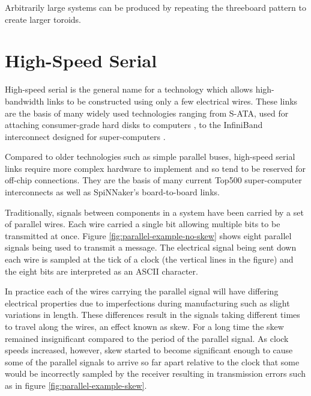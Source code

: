 			Arbitrarily large systems can be produced by repeating the threeboard
			pattern to create larger toroids.
	
	\break
	\section{High-Speed Serial}
		
		\label{sec:high-speed-serial}
		
		
		High-speed serial is the general name for a technology which allows
		high-bandwidth links to be constructed using only a few electrical wires.
		These links are the basis of many widely used technologies ranging from
		S-ATA, used for attaching consumer-grade hard disks to computers
		\cite{sataio}, to the InfiniBand interconnect designed for super-computers
		\cite{infinibandta}.
		
		Compared to older technologies such as simple parallel buses, high-speed
		serial links require more complex hardware to implement and so tend to be
		reserved for off-chip connections. They are the basis of many current Top500
		super-computer interconnects as well as SpiNNaker's board-to-board links.
		
		Traditionally, signals between components in a system have been carried by a
		set of parallel wires. Each wire carried a single bit allowing multiple bits
		to be transmitted at once. Figure \ref{fig:parallel-example-no-skew} shows
		eight parallel signals being used to transmit a message. The electrical
		signal being sent down each wire is sampled at the tick of a clock (the
		vertical lines in the figure) and the eight bits are interpreted as an ASCII
		character.
		
		In practice each of the wires carrying the parallel signal will have
		differing electrical properties due to imperfections during manufacturing
		such as slight variations in length. These differences result in the
		signals taking different times to travel along the wires, an effect known
		as skew. For a long time the skew remained insignificant compared to the
		period of the parallel signal.  As clock speeds increased, however, skew
		started to become significant enough to cause some of the parallel signals
		to arrive so far apart relative to the clock that some would be
		incorrectly sampled by the receiver resulting in transmission errors such
		as in figure \ref{fig:parallel-example-skew}.
		
